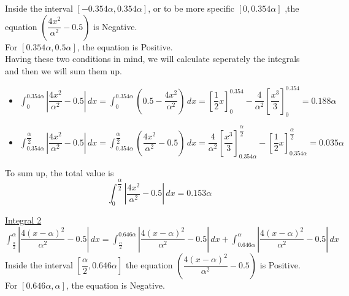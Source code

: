 Inside the interval $[-0.354\alpha, 0.354\alpha]$, or to be more specific $[0, 0.354\alpha]$ ,the equation $\left(\dfrac{4x^2}{\alpha^2} - 0.5\right)$ is Negative.\\
For $[0.354\alpha, 0.5\alpha]$, the equation is Positive.\\

Having these two conditions in mind, we will calculate seperately the integrals and then we will sum them up.
\begin{itemize}
	\item $\displaystyle \int_{0}^{0.354\alpha} \left| \dfrac{4x^2}{\alpha^2} - 0.5 \right| \, dx = \int_{0}^{0.354\alpha}\left(0.5 - \dfrac{4x^2}{\alpha^2}\right)\, dx = \left[\dfrac{1}{2}x\right]^{0.354}_0 - \dfrac{4}{\alpha^2}\left[\dfrac{x^3}{3}\right]^{0.354}_0 = 0.188\alpha$
	\vspace{3mm}
	
	\item $\displaystyle \int_{0.354\alpha}^{\dfrac{\alpha}{2}} \left| \dfrac{4x^2}{\alpha^2} - 0.5 \right| \, dx = \int_{0.354\alpha}^{\dfrac{\alpha}{2}} \left( \dfrac{4x^2}{\alpha^2} - 0.5\right) \, dx = \dfrac{4}{\alpha^2}\left[\dfrac{x^3}{3}\right]^{\dfrac{\alpha}{2}}_{0.354\alpha} - \left[\dfrac{1}{2}x\right]^{\dfrac{\alpha}{2}}_{0.354\alpha} = 0.035\alpha $
\end{itemize}
\vspace{4mm}
To sum up, the total value is \\
\begin{equation}
	\displaystyle\int_{0}^{\dfrac{\alpha}{2}} \left| \dfrac{4x^2}{\alpha^2} - 0.5 \right| \, dx = 0.153\alpha
	\label{eq:integral1}
\end{equation}
\vspace{7mm}

\underline{Integral 2}\\

$\displaystyle \int_{\frac{\alpha}{2}}^{\alpha} \left| \dfrac{4(x-\alpha)^2}{\alpha^2} - 0.5 \right| \, dx = \int_{\frac{\alpha}{2}}^{0.646\alpha}\left| \dfrac{4(x-\alpha)^2}{\alpha^2} - 0.5 \right| \, dx + \int_{0.646\alpha}^{\alpha} \left| \dfrac{4(x-\alpha)^2}{\alpha^2} - 0.5 \right| \, dx$
\\

Inside the interval $\left[\dfrac{\alpha}{2}, 0.646\alpha \right]$ the equation $\left(\dfrac{4(x-\alpha)^2}{\alpha^2} - 0.5\right)$ is Positive.\\
For $[0.646\alpha, \alpha]$, the equation is Negative.\\

